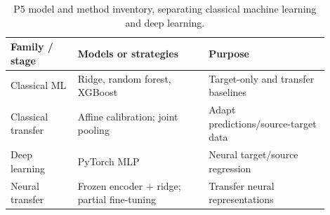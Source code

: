 \begin{table}[!htbp]\centering\footnotesize
\setlength{\tabcolsep}{5pt}
\caption{P5 model and method inventory, separating classical machine learning and deep learning.}\label{tab:p5methods}
\begin{tabular}{@{}p{0.19\linewidth}p{0.37\linewidth}p{0.34\linewidth}@{}}\toprule
\textbf{Family / stage} & \textbf{Models or strategies} & \textbf{Purpose}\\\midrule
\rowcolor{gold!10}
Classical ML & Ridge, random forest, XGBoost & Target-only and transfer baselines\\
\rowcolor{gold!10}
Classical transfer & Affine calibration; joint pooling & Adapt predictions/source-target data\\
\rowcolor{teal!9}
Deep learning & PyTorch MLP & Neural target/source regression\\
\rowcolor{teal!9}
Neural transfer & Frozen encoder + ridge; partial fine-tuning & Transfer neural representations\\
\bottomrule\end{tabular}
\end{table}


